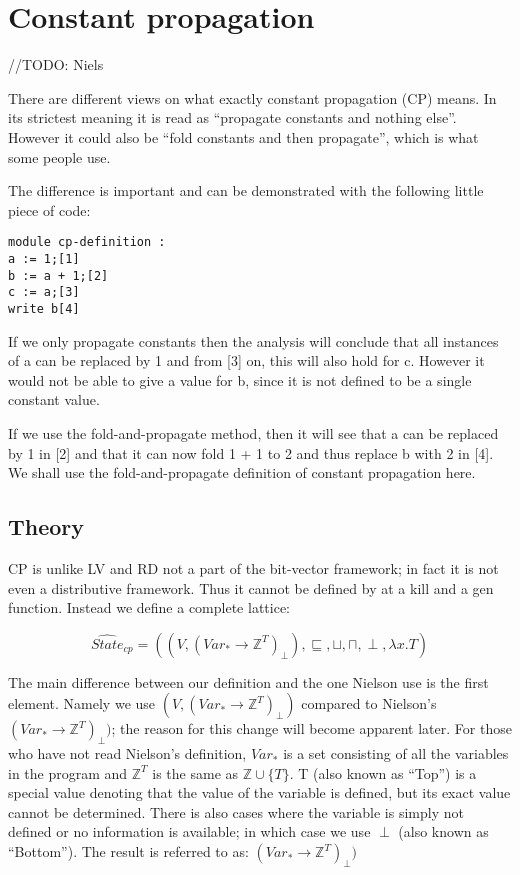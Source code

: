 \section{Constant propagation}
//TODO: Niels

There are different views on what exactly constant propagation (CP) means. In its
strictest meaning it is read as ``propagate constants and nothing else''.
However it could also be ``fold constants and then propagate'', which is what
some people use.

  The difference is important and can be demonstrated with the following little
piece of code:

\begin{lstlisting}
module cp-definition :
a := 1;[1]
b := a + 1;[2]
c := a;[3]
write b[4]
\end{lstlisting}

If we only propagate constants then the analysis will conclude that all instances
of a can be replaced by 1 and from [3] on, this will also hold for c. However it
would not be able to give a value for b, since it is not defined to be a 
single constant value.

  If we use the fold-and-propagate method, then it will see that a can be replaced
by 1 in [2] and that it can now fold 1 + 1 to 2 and thus replace b with 2 in [4].
We shall use the fold-and-propagate definition of constant propagation here.

\subsection{Theory}
CP is unlike LV and RD not a part of the bit-vector framework; in fact it is not
even a distributive framework. Thus it cannot be defined by at a kill and a gen
function. Instead we define a complete lattice:

\[ \hat{State}_{cp} = ((V, (Var_{*} \rightarrow \mathbb{Z}^{T})_\perp), \sqsubseteq, \sqcup, \sqcap, \perp, \lambda x.T) \]

\docpar
The main difference between our definition and the one Nielson use is the first
element. Namely we use $(V, (Var_{*} \rightarrow \mathbb{Z}^{T})_\perp)$
compared to Nielson's $(Var_{*} \rightarrow \mathbb{Z}^{T})_\perp)$; the
reason for this change will become apparent later.
  For those who have not read Nielson's definition, $Var_{*}$ is a set consisting
of all the variables in the program and $\mathbb{Z}^T$ is the same as
$\mathbb{Z} \cup \{T\}$. T (also known as ``Top'') is a special value denoting
that the value of the variable is defined, but its exact value cannot be
determined. There is also cases where the variable is simply not defined or
no information is available; in which case we use $\perp$ (also known as
``Bottom''). The result is referred to as:
 $(Var_{*} \rightarrow \mathbb{Z}^{T})_\perp)$

